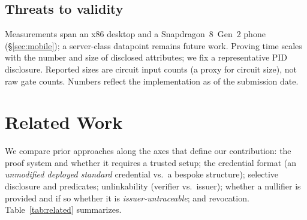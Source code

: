 \documentclass[11pt]{article}
\theoremstyle{plain}
\theoremstyle{definition}
\begin{document}
\subsection{Threats to validity}
Measurements span an x86 desktop and a Snapdragon~8~Gen~2 phone (\S\ref{sec:mobile}); a
server-class datapoint remains future work. Proving time scales with the number and size of disclosed attributes; we
fix a representative PID disclosure. Reported sizes are circuit input counts (a proxy
for circuit size), not raw gate counts. Numbers reflect the implementation as of the
submission date.

\section{Related Work}\label{sec:related}

We compare prior approaches along the axes that define our contribution: the proof
system and whether it requires a trusted setup; the credential format (an
\emph{unmodified deployed standard} credential vs.\ a bespoke structure); selective
disclosure and predicates; unlinkability (verifier vs.\ issuer); whether a nullifier is
provided and if so whether it is \emph{issuer-untraceable}; and revocation.
Table~\ref{tab:related} summarizes.
\end{document}
